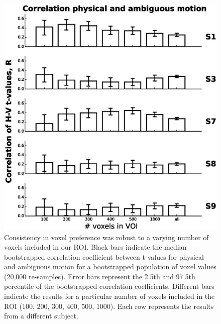 \begin{figure}[htbp!]
\centering
\includegraphics[width=\textwidth]{figures/chapter_03_SI/figS6.eps}
\caption{Consistency in voxel preference was robust to a varying number of voxels included in our ROI. Black bars indicate the median bootstrapped correlation coefficient between t-values for physical and ambiguous motion for a bootstrapped population of voxel values (20,000 re-samples). Error bars represent the 2.5th and 97.5th percentile of the bootstrapped correlation coefficients. Different bars indicate the results for a particular number of voxels included in the ROI (100, 200, 300, 400, 500, 1000). Each row represents the results from a different subject.}
\label{fig:fig3C_supp}
\end{figure}

